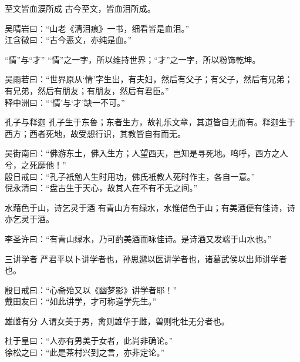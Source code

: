 \begin{yulu}{至文皆血涙所成}
古今至文，皆血泪所成。
\begin{comments}
吴晴岩曰：“山老《清泪痕》一书，细看皆是血泪。” \\
江含徵曰：“古今恶文，亦纯是血。”
\end{comments}
\end{yulu}

\begin{yulu}{“情”与“才”}
“情”之一字，所以维持世界；“才”之一字，所以粉饰乾坤。
\begin{comments}
吴雨若曰：“世界原从‘情’字生出，有夫妇，然后有父子；有父子，然后有兄弟；有兄弟，然后有朋友；有朋友，然后有君臣。” \\
释中洲曰：“‘情’与‘才’缺一不可。”
\end{comments}
\end{yulu}

\begin{yulu}{孔子与释迦}
孔子生于东鲁；东者生方，故礼乐文章，其道皆自无而有。释迦生于西方；西者死地，故受想行识，其教皆自有而无。
\begin{comments}
吴街南曰：“佛游东土，佛入生方；人望西天，岂知是寻死地。呜呼，西方之人兮，之死靡他！” \\
殷日戒曰：“孔子衹勉人生时用功，佛氏衹教人死时作主，各自一意。” \\
倪永清曰：“盘古生于天心，故其人在不有不无之间。”
\end{comments}
\end{yulu}

\begin{yulu}{水藉色于山，诗乞灵于酒}
有青山方有绿水，水惟借色于山；有美酒便有佳诗，诗亦乞灵于酒。
\begin{comments}
李圣许曰：“有青山绿水，乃可酌美酒而咏佳诗。是诗酒又发端于山水也。”
\end{comments}
\end{yulu}

\begin{yulu}{三讲学者}
严君平以卜讲学者也，孙思邈以医讲学者也，诸葛武侯以出师讲学者也。
\begin{comments}
殷日戒曰：“心斋殆又以《幽梦影》讲学者耶！” \\
戴田友曰：“如此讲学，才可称道学先生。”
\end{comments}
\end{yulu}

\begin{yulu}{雄雌有分}
人谓女美于男，禽则雄华于雌，兽则牝牡无分者也。
\begin{comments}
杜于皇曰：“人亦有男美于女者，此尚非确论。” \\
徐松之曰：“此是茶村兴到之言，亦非定论。”
\end{comments}
\end{yulu}


